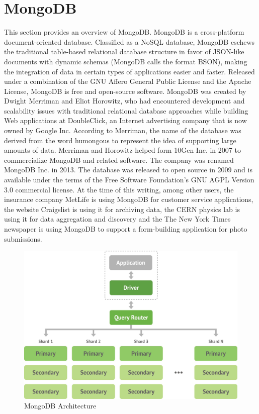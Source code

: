 \section{MongoDB}
\label{sec:mongodb}
This section provides an overview of MongoDB.
\newline
MongoDB is a cross-platform document-oriented database. Classified as a NoSQL database, MongoDB eschews the traditional table-based relational database structure in favor of JSON-like documents with dynamic schemas (MongoDB calls the format BSON), making the integration of data in certain types of applications easier and faster. Released under a combination of the GNU Affero General Public License and the Apache License, MongoDB is free and open-source software.
\newline
MongoDB was created by Dwight Merriman and Eliot Horowitz, who had encountered development and scalability issues with traditional relational database approaches while building Web applications at DoubleClick, an Internet advertising company that is now owned by Google Inc. According to Merriman, the name of the database was derived from the word humongous to represent the idea of supporting large amounts of data. Merriman and Horowitz helped form 10Gen Inc. in 2007 to commercialize MongoDB and related software. The company was renamed MongoDB Inc. in 2013.
\newline
The database was released to open source in 2009 and is available under the terms of the Free Software Foundation’s GNU AGPL Version 3.0 commercial license. At the time of this writing, among other users, the insurance company MetLife is using MongoDB for customer service applications, the website Craigslist is using it for archiving data, the CERN physics lab is using it for data aggregation and discovery and the The New York Times newspaper is using MongoDB to support a form-building application for photo submissions.
\begin{figure}[htb]
 \centering
 \includegraphics[width=1.0\linewidth]{images/chapter2/MongoDB-Architecture.jpg}\hfill
 \caption[MongoDB Architecture]{MongoDB Architecture}
 \label{fig:mongodb_architecture}
\end{figure}